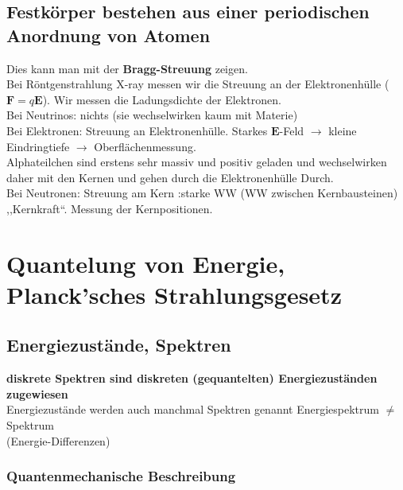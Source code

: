 \documentclass[titlepage,11pt,a4paper,ngerman]{report}
\renewcommand{\vec}[1]{\boldsymbol{#1}}
\begin{document}
\subsection{Festkörper bestehen aus einer periodischen Anordnung von Atomen}

Dies kann man mit der \textbf{Bragg-Streuung} zeigen.\\[5pt]
Bei Röntgenstrahlung X-ray messen wir die Streuung an der Elektronenhülle ($ \vec{F} = q \vec{E} $). Wir messen die Ladungsdichte der Elektronen.\\
Bei Neutrinos: nichts (sie wechselwirken kaum mit Materie)\\
Bei Elektronen: Streuung an Elektronenhülle. Starkes $ \vec{E} $-Feld $ \rightarrow $ kleine Eindringtiefe $ \rightarrow $ Oberflächenmessung.\\
Alphateilchen sind erstens sehr massiv und positiv geladen und wechselwirken daher mit den Kernen und gehen durch die Elektronenhülle Durch.\\
Bei Neutronen: Streuung am Kern :starke WW (WW zwischen Kernbausteinen) ,,Kernkraft``. Messung der Kernpositionen.\\

\section{Quantelung von Energie, Planck'sches Strahlungsgesetz}

\subsection{Energiezustände, Spektren}

\textbf{diskrete Spektren sind diskreten (gequantelten) Energiezuständen zugewiesen}\\
Energiezustände werden auch manchmal Spektren genannt Energiespektrum $ \neq $ Spektrum \\(Energie-Differenzen)

\subsubsection{Quantenmechanische Beschreibung}
\end{document}
